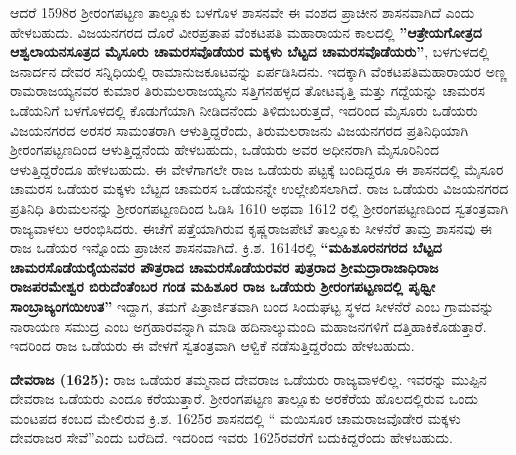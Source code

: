 ಆದರೆ 1598ರ ಶ‍್ರೀರಂಗಪಟ್ಟಣ ತಾಲ್ಲೂಕು ಬಳಗೊಳ ಶಾಸನವೇ ಈ ವಂಶದ ಪ್ರಾಚೀನ ಶಾಸನವಾಗಿದೆ ಎಂದು ಹೇಳಬಹುದು. ವಿಜಯನಗರದ ದೊರೆ ವೀರಪ್ರತಾಪ ವೆಂಕಟಪತಿ ಮಹಾರಾಯನ ಕಾಲದಲ್ಲಿ \textbf{''ಆತ್ರೇಯಗೋತ್ರದ ಆಶ್ವಲಾಯನ\-ಸೂತ್ರದ ಮೈಸೂರು ಚಾಮರಸವೊಡೆಯರ ಮಕ್ಕಳು ಬೆಟ್ಟದ ಚಾಮರಸವೊಡೆಯರು''}, ಬಳಗುಳದಲ್ಲಿ ಜನಾರ್ದನ ದೇವರ ಸನ್ನಿಧಿಯಲ್ಲಿ ರಾಮಾನುಜಕೂಟವನ್ನು ಏರ್ಪಡಿಸಿದನು. ಇದಕ್ಕಾಗಿ ವೆಂಕಟಪತಿಮಹಾರಾಯರ ಅಣ್ಣ ರಾಮರಾಜಯ್ಯ\-ನವರ ಕುಮಾರ ತಿರುಮಲರಾಜಯ್ಯನು ಸತ್ತಿಗನಹಳ್ಳದ ತೋಟವೃತ್ತಿ ಮತ್ತು ಗದ್ದೆಯನ್ನು ಚಾಮರಸ ಒಡೆಯನಿಗೆ ಬಳಗೊಳದಲ್ಲಿ ಕೊಡುಗೆಯಾಗಿ ನೀಡಿದನೆಂದು ತಿಳಿದುಬರುತ್ತದೆ, ಇದರಿಂದ ಮೈಸೂರು ಒಡೆಯರು ವಿಜಯನಗರದ ಅರಸರ ಸಾಮಂತರಾಗಿ ಆಳುತ್ತಿದ್ದರೆಂದು, ತಿರುಮಲರಾಜನು ವಿಜಯನಗರದ ಪ್ರತಿನಿಧಿಯಾಗಿ ಶ‍್ರೀರಂಗಪಟ್ಟಣದಿಂದ ಆಳುತ್ತಿದ್ದನೆಂದು ಹೇಳಬಹುದು, ಒಡೆಯರು ಅವರ ಅಧೀನರಾಗಿ ಮೈಸೂರಿನಿಂದ ಆಳುತ್ತಿದ್ದರೆಂದೂ ಹೇಳಬಹುದು. ಈ ವೇಳೆಗಾಗಲೇ ರಾಜ ಒಡೆಯರು ಪಟ್ಟಕ್ಕೆ ಬಂದಿದ್ದರೂ ಈ ಶಾಸನದಲ್ಲಿ ಮೈಸೂರ ಚಾಮರಸ ಒಡೆಯರ ಮಕ್ಕಳು ಬೆಟ್ಟದ ಚಾಮರಸ ಒಡೆಯನನ್ನೇ ಉಲ್ಲೇಖಿಸ\-ಲಾಗಿದೆ. ರಾಜ ಒಡೆಯರು ವಿಜಯನಗರದ ಪ್ರತಿನಿಧಿ ತಿರುಮಲನನ್ನು ಶ‍್ರೀರಂಗಪಟ್ಟಣದಿಂದ ಓಡಿಸಿ 1610 ಅಥವಾ 1612 ರಲ್ಲಿ ಶ‍್ರೀರಂಗಪಟ್ಟಣದಿಂದ ಸ್ವತಂತ್ರವಾಗಿ ರಾಜ್ಯವಾಳಲು ಆರಂಭಿಸಿದರು. ಈಚೆಗೆ ಪತ್ತೆಯಾಗಿರುವ ಕೃಷ್ಣರಾಜಪೇಟೆ ತಾಲ್ಲೂಕು ಸೀಳನೆರೆ ತಾಮ್ರ ಶಾಸನವು ಈ ರಾಜ ಒಡೆಯರ ಇನ್ನೊಂದು ಪ್ರಾಚೀನ ಶಾಸನವಾಗಿದೆ. ಕ್ರಿ.ಶ. 1614ರಲ್ಲಿ \textbf{“ಮಹಿಶೂರನಗರದ ಬೆಟ್ಟದ ಚಾಮರಸೊಡೆಯರೈಯನವರ ಪೌತ್ರರಾದ ಚಾಮರಸೊಡೆಯರವರ ಪುತ್ರರಾದ\general{\break } ಶ‍್ರೀಮದ್ರಾರಾಜಾಧಿರಾಜ ರಾಜಪರಮೇಶ್ವರ ಬಿರುದೆಂತೆಂಬರ ಗಂಡ ಮಹಿಶೂರ ರಾಜ ಒಡೆಯರು ಶ‍್ರೀರಂಗಪಟ್ಟಣದಲ್ಲಿ ಪೃಥ್ವೀ ಸಾಂಬ್ರಾಜ್ಯಂಗಯಿಉತ”} ಇದ್ದಾಗ, ತಮಗೆ ಪಿತ್ರಾರ್ಜಿತವಾಗಿ ಬಂದ ಸಿಂದುಘಟ್ಟ ಸ್ಥಳದ ಸೀಳನೆರೆ ಎಂಬ ಗ್ರಾಮವನ್ನು ನಾರಾಯಣ ಸಮುದ್ರ ಎಂಬ ಅಗ್ರಹಾರವನ್ನಾಗಿ ಮಾಡಿ ಹದಿನಾಲ್ಕುಮಂದಿ ಮಹಾಜನಗಳಿಗೆ ದತ್ತಿಹಾಕಿಕೊಡುತ್ತಾರೆ. ಇದರಿಂದ ರಾಜ ಒಡೆಯರು ಈ ವೇಳಗೆ ಸ್ವತಂತ್ರವಾಗಿ ಆಳ್ವಿಕೆ ನಡೆಸುತ್ತಿದ್ದರೆಂದು ಹೇಳಬಹುದು.

\textbf{ದೇವರಾಜ (1625): } ರಾಜ ಒಡೆಯರ ತಮ್ಮನಾದ ದೇವರಾಜ ಒಡೆಯರು ರಾಜ್ಯವಾಳಲಿಲ್ಲ. ಇವರನ್ನು ಮುಪ್ಪಿನ ದೇವರಾಜ ಒಡೆಯರು ಎಂದೂ ಕರೆಯುತ್ತಾರೆ. ಶ‍್ರೀರಂಗಪಟ್ಟಣ ತಾಲ್ಲೂಕು ಅರಕೆರೆಯ ಹೊಲದಲ್ಲಿರುವ ಒಂದು ಮಂಟಪದ ಕಂಬದ ಮೇಲಿರುವ ಕ್ರಿ.ಶ. 1625ರ ಶಾಸನದಲ್ಲಿ “ ಮಯಿಸೂರ ಚಾಮರಾಜವೊಡೇರ ಮಕ್ಕಳು ದೇವರಾಜರ ಸೇವೆ”ಎಂದು ಬರೆದಿದೆ. ಇದರಿಂದ ಇವರು 1625ರವರೆಗೆ ಬದುಕಿದ್ದರೆಂದು ಹೇಳಬಹುದು.

